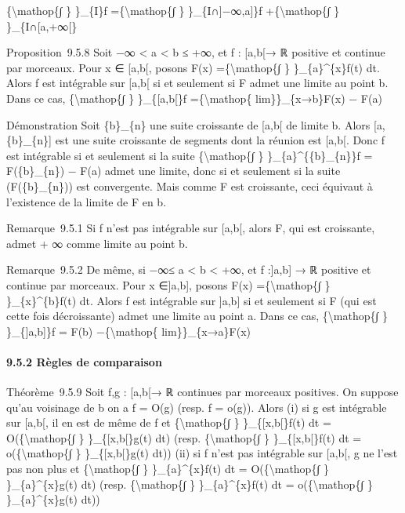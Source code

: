 \documentclass[]{article}
\begin{document}
\{\textbackslash{}mathop\{∫ \} \}\_\{I\}f =\{\textbackslash{}mathop\{∫
\} \}\_\{I∩{]}−∞,a{]}\}f +\{\textbackslash{}mathop\{∫ \}
\}\_\{I∩{[}a,+∞{[}\}

Proposition~9.5.8 Soit −∞ \textless{} a \textless{} b ≤ +∞, et f :
{[}a,b{[}→ ℝ positive et continue par morceaux. Pour x ∈ {[}a,b{[},
posons F(x) =\{\textbackslash{}mathop\{∫ \} \}\_\{a\}\^{}\{x\}f(t) dt.
Alors f est intégrable sur {[}a,b{[} si et seulement si F admet une
limite au point b. Dans ce cas, \{\textbackslash{}mathop\{∫ \}
\}\_\{{[}a,b{[}\}f =\{\textbackslash{}mathop\{ lim\}\}\_\{x→b\}F(x) −
F(a)

Démonstration Soit \{b\}\_\{n\} une suite croissante de {[}a,b{[} de
limite b. Alors {[}a,\{b\}\_\{n\}{]} est une suite croissante de
segments dont la réunion est {[}a,b{[}. Donc f est intégrable si et
seulement si la suite \{\textbackslash{}mathop\{∫ \}
\}\_\{a\}\^{}\{\{b\}\_\{n\}\}f = F(\{b\}\_\{n\}) − F(a) admet une
limite, donc si et seulement si la suite (F(\{b\}\_\{n\})) est
convergente. Mais comme F est croissante, ceci équivaut à l'existence de
la limite de F en b.

Remarque~9.5.1 Si f n'est pas intégrable sur {[}a,b{[}, alors F, qui est
croissante, admet + ∞ comme limite au point b.

Remarque~9.5.2 De même, si −∞≤ a \textless{} b \textless{} +∞, et f
:{]}a,b{]} → ℝ positive et continue par morceaux. Pour x ∈{]}a,b{]},
posons F(x) =\{\textbackslash{}mathop\{∫ \} \}\_\{x\}\^{}\{b\}f(t) dt.
Alors f est intégrable sur {]}a,b{]} si et seulement si F (qui est cette
fois décroissante) admet une limite au point a. Dans ce cas,
\{\textbackslash{}mathop\{∫ \} \}\_\{{]}a,b{]}\}f = F(b)
−\{\textbackslash{}mathop\{ lim\}\}\_\{x→a\}F(x)

\paragraph{9.5.2 Règles de comparaison}

Théorème~9.5.9 Soit f,g : {[}a,b{[}→ ℝ continues par morceaux positives.
On suppose qu'au voisinage de b on a f = O(g) (resp. f = o(g)). Alors
(i) si g est intégrable sur {[}a,b{[}, il en est de même de f et
\{\textbackslash{}mathop\{∫ \} \}\_\{{[}x,b{[}\}f(t) dt =
O(\{\textbackslash{}mathop\{∫ \} \}\_\{{[}x,b{[}\}g(t) dt) (resp.
\{\textbackslash{}mathop\{∫ \} \}\_\{{[}x,b{[}\}f(t) dt =
o(\{\textbackslash{}mathop\{∫ \} \}\_\{{[}x,b{[}\}g(t) dt)) (ii) si f
n'est pas intégrable sur {[}a,b{[}, g ne l'est pas non plus et
\{\textbackslash{}mathop\{∫ \} \}\_\{a\}\^{}\{x\}f(t) dt =
O(\{\textbackslash{}mathop\{∫ \} \}\_\{a\}\^{}\{x\}g(t) dt) (resp.
\{\textbackslash{}mathop\{∫ \} \}\_\{a\}\^{}\{x\}f(t) dt =
o(\{\textbackslash{}mathop\{∫ \} \}\_\{a\}\^{}\{x\}g(t) dt))
\end{document}
